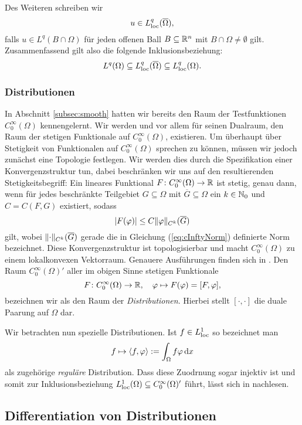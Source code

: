 Des Weiteren schreiben wir
$$
u \in L^q_{\operatorname{loc}}(\overline\Omega),
$$
falls $u \in L^q(B \cap \Omega)$ für jeden offenen Ball $B \subseteq \mathbb{R}^n$ mit $B \cap \Omega \neq \emptyset$ gilt.
Zusammenfassend gilt also die folgende Inklusionsbeziehung:
$$
L^q(\Omega) \subseteq L^q_{\operatorname{loc}}(\overline\Omega) \subseteq L^q_{\operatorname{loc}}(\Omega).
$$

\subsubsection{Distributionen}

In Abschnitt \ref{subsec:smooth} hatten wir bereits den Raum der Testfunktionen $C_0^\infty(\Omega)$ kennengelernt.
Wir werden und vor allem für seinen Dualraum, den Raum der stetigen Funktionale auf $C_0^\infty(\Omega)$, existieren.
Um überhaupt über Stetigkeit von Funktionalen auf $C_0^\infty(\Omega)$ sprechen zu können, müssen wir jedoch zunächst eine Topologie festlegen.
Wir werden dies durch die Spezifikation einer Konvergenzstruktur tun, dabei beschränken wir uns auf den resultierenden Stetigkeitsbegriff:
Ein lineares Funktional $F \colon C_0^\infty(\Omega) \to \mathbb{R}$ ist stetig, genau dann, wenn für jedes beschränkte Teilgebiet $G \subseteq \Omega$ mit $\overline G \subseteq \Omega$ ein $k \in \mathbb{N}_0$ und $C = C(F,G)$ existiert, sodass
$$
|F(\varphi)| \leq C \lVert \varphi \rVert_{C^k}(\overline G)
$$
gilt, wobei $\lVert \cdot \rVert_{C^k}(\overline G)$ gerade die in Gleichung (\ref{eq:cInftyNorm}) definierte Norm bezeichnet.
Diese Konvergenzstruktur ist topologisierbar und macht $C_0^\infty(\Omega)$ zu einem lokalkonvexen Vektorraum.
Genauere Ausführungen finden sich in \cite[S.433f.]{werner2011fa}.
Den Raum $C_0^\infty(\Omega)'$ aller im obigen Sinne stetigen Funktionale
$$
F \colon C_0^\infty(\Omega) \to \mathbb{R}, \quad \varphi \mapsto F(\varphi) = [F, \varphi],
$$
bezeichnen wir als den Raum der \emph{Distributionen}.
Hierbei stellt $[\cdot,\cdot]$ die duale Paarung auf $\Omega$ dar. 

Wir betrachten nun spezielle Distributionen.
Ist $f \in L^1_{\operatorname{loc}}$ so bezeichnet man 
$$
f \mapsto \langle f, \varphi \rangle := \int_\Omega f \varphi \, {\operatorname{d}\!{x}}
$$
als zugehörige \emph{reguläre} Distribution.
Dass diese Zuodrnung sogar injektiv ist und somit zur Inklusionsbeziehung $L^1_{\operatorname{loc}}(\Omega) \subseteq C^\infty_0(\Omega)'$ führt, lässt sich in \cite[S.432, Beispiel (a)]{werner2011fa} nachlesen.

\subsection{Differentiation von Distributionen}

